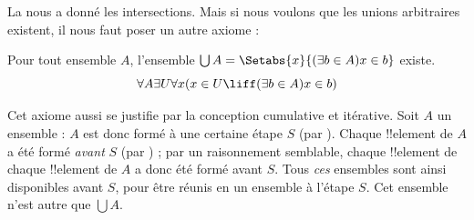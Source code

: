 \documentclass[../../../include/open-logic-section]{subfiles}
\begin{document}

La  nous a donné les
intersections. Mais si nous voulons que les unions arbitraires existent,
il nous faut poser un autre axiome :

\begin{axiom}[Union] Pour tout ensemble $A$, l'ensemble $\bigcup A =
\Setabs{x}{(\exists b \in A) x \in b}$ existe.
\[
	\forall A \exists U \forall x(x \in U \liff (\exists b \in A)x \in b)
\]
\end{axiom}

Cet axiome aussi se justifie par la conception cumulative et
itérative. Soit $A$ un ensemble : $A$ est donc formé à une certaine
étape $S$ (par \stageshier). Chaque !!{element} de $A$ a été formé
\emph{avant} $S$ (par \stagesacc) ; par un raisonnement semblable,
chaque !!{element} de chaque !!{element} de $A$ a donc été formé
avant $S$. Tous \emph{ces} ensembles sont ainsi disponibles avant
$S$, pour être réunis en un ensemble à l'étape $S$. Cet ensemble
n'est autre que $\bigcup A$.
\end{document}
